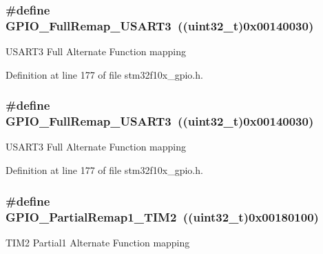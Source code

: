 \subsubsection[{\texorpdfstring{G\+P\+I\+O\+\_\+\+Full\+Remap\+\_\+\+U\+S\+A\+R\+T3}{GPIO_FullRemap_USART3}}]{\setlength{\rightskip}{0pt plus 5cm}\#define G\+P\+I\+O\+\_\+\+Full\+Remap\+\_\+\+U\+S\+A\+R\+T3~(({\bf uint32\+\_\+t})0x00140030)}\hypertarget{group___g_p_i_o___remap__define_gaa8831190b5b68e9f871955b791fa358b}{}\label{group___g_p_i_o___remap__define_gaa8831190b5b68e9f871955b791fa358b}
U\+S\+A\+R\+T3 Full Alternate Function mapping 

Definition at line 177 of file stm32f10x\+\_\+gpio.\+h.

\subsubsection[{\texorpdfstring{G\+P\+I\+O\+\_\+\+Full\+Remap\+\_\+\+U\+S\+A\+R\+T3}{GPIO_FullRemap_USART3}}]{\setlength{\rightskip}{0pt plus 5cm}\#define G\+P\+I\+O\+\_\+\+Full\+Remap\+\_\+\+U\+S\+A\+R\+T3~(({\bf uint32\+\_\+t})0x00140030)}\hypertarget{group___g_p_i_o___remap__define_gaa8831190b5b68e9f871955b791fa358b}{}\label{group___g_p_i_o___remap__define_gaa8831190b5b68e9f871955b791fa358b}
U\+S\+A\+R\+T3 Full Alternate Function mapping 

Definition at line 177 of file stm32f10x\+\_\+gpio.\+h.

\subsubsection[{\texorpdfstring{G\+P\+I\+O\+\_\+\+Partial\+Remap1\+\_\+\+T\+I\+M2}{GPIO_PartialRemap1_TIM2}}]{\setlength{\rightskip}{0pt plus 5cm}\#define G\+P\+I\+O\+\_\+\+Partial\+Remap1\+\_\+\+T\+I\+M2~(({\bf uint32\+\_\+t})0x00180100)}\hypertarget{group___g_p_i_o___remap__define_ga7ad69d3e2643b2bfee4eebbea4a5b80e}{}\label{group___g_p_i_o___remap__define_ga7ad69d3e2643b2bfee4eebbea4a5b80e}
T\+I\+M2 Partial1 Alternate Function mapping 

